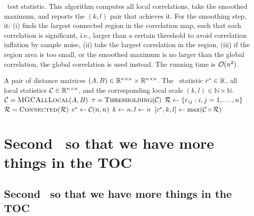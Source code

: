 \documentclass{article}
\begin{document}
\begin{algorithm}
\caption{\Mgc~test statistic. This algorithm computes all local correlations, take the smoothed maximum, and reports the $(k,l)$ pair that achieves it. For the smoothing step, it: (i) finds the largest connected region in the correlation map, such that each correlation is significant, i.e., larger than a certain threshold to avoid correlation inflation by sample noise, (ii) take the largest correlation in the region, (iii) if the region area is too small, or the smoothed maximum is no larger than the global correlation, the global correlation is used instead. The running time is $\mathcal{O}(n^2)$.}
\label{alg:sample_mgc}
\begin{algorithmic}[1]
\Require A pair of distance matrices $(A, B) \in \mathbb{R}^{n \times n} \times \mathbb{R}^{n \times n}$.
\Ensure The \Mgc~statistic $c^{*} \in \mathbb{R}$, all local statistics $\mathcal{C} \in \mathbb{R}^{n \times n}$, and the corresponding local scale $(k,l) \in \mathbb{N} \times \mathbb{N}$.
\State $\mathcal{C}=\textsc{MGCAllLocal}(A,B)$ 
\State $\tau = \textsc{Thresholding}(\mathcal{C})$ 
 
\State $\mathcal{R} \leftarrow \{r_{ij} : i,j = 1,\ldots, n\}$ 
\State $\mathcal{R}  = \textsc{Connected}(\mathcal{R} )$ 
\State $c^{*} \leftarrow \mathcal{C}(n,n)$ 
\State $k \leftarrow n, l \leftarrow n$
 
\State $[c^{*},k,l] \leftarrow \max (\mathcal{C} \circ \mathcal{R})$ 
\EndIf
\EndFunction
\end{algorithmic}
\end{algorithm}



\section{Second \textsection\, so that we have more things in the TOC}
\lipsum[4]
\subsection{Second \textsection\textsection\, so that we have more things in the TOC}
\lipsum[5]


\clearpage



\end{document}
